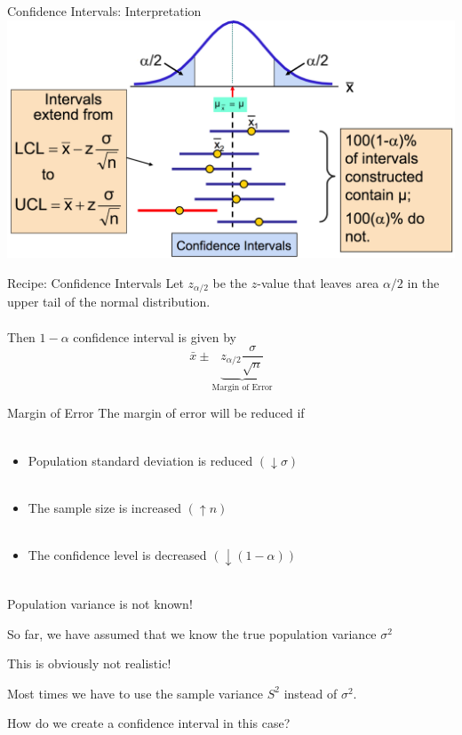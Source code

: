 \documentclass{./../div_teaching_slides}
\begin{document}
\begin{frame}{Confidence Intervals: Interpretation}
\centering
\includegraphics[scale=0.5]{ci_int.png}	
\end{frame}


\begin{frame}{Recipe: Confidence Intervals}
Let $z_{\alpha/2}$ be the $z$-value that leaves area $\alpha/2$ in the upper tail of the normal distribution. \\~\\
Then $1-\alpha$ confidence interval is given by 
$$ \bar{x} \pm  \underbrace{z_{\alpha/2}  \frac{\sigma}{\sqrt{n}}}_{\text{Margin of Error}} $$
\end{frame}

\begin{frame}{Margin of Error}
The margin of error will be reduced if \\~\\
\begin{itemize}
\item Population standard deviation is reduced $(\downarrow \sigma)$ \\~\\
\item The sample size is increased $(\uparrow n)$  \\~\\
\item The confidence level is decreased $(\downarrow (1-\alpha))$  \\~\\
\end{itemize}
\end{frame}

\begin{frame}{Population variance is not known!}
\begin{witemize}
  \item So far, we have assumed that we know the true population variance $\sigma^2$
  \item This is obviously not realistic!
  \item Most times we have to use the sample variance $S^2$ instead of $\sigma^2$. 
  \item How do we create a confidence interval in this case?
\end{witemize}
\end{frame}
\end{document}
